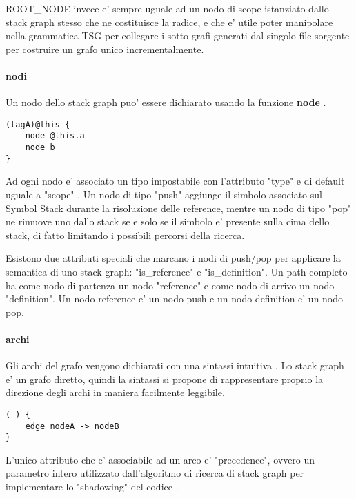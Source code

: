 ROOT\_NODE invece e' sempre uguale ad un nodo di scope istanziato dallo stack graph stesso che ne costituisce la radice, e che e' utile poter manipolare nella grammatica TSG per collegare i sotto grafi generati dal singolo file sorgente per costruire un grafo unico incrementalmente.

\paragraph{nodi}

Un nodo dello stack graph puo' essere dichiarato usando la funzione \textbf{node} \cite{TreeSitterGraphReferenceGraphNodes}.

\begin{Verbatim}[samepage=true]
(tagA)@this {
    node @this.a
    node b
}
\end{Verbatim}

Ad ogni nodo e' associato un tipo impostabile con l'attributo "type" e di default uguale a "scope" \cite{TreeSitterStackGraphNodes}.
Un nodo di tipo "push" aggiunge il simbolo associato sul Symbol Stack durante la risoluzione delle reference, mentre un nodo di tipo "pop" ne rimuove uno dallo stack se e solo se il simbolo e' presente sulla cima dello stack, di fatto limitando i possibili percorsi della ricerca.

Esistono due attributi speciali che marcano i nodi di push/pop per applicare la semantica di uno stack graph: "is\_reference" e "is\_definition".
Un path completo ha come nodo di partenza un nodo "reference" e come nodo di arrivo un nodo "definition".
Un nodo reference e' un nodo push e un nodo definition e' un nodo pop.

\paragraph{archi}

Gli archi del grafo vengono dichiarati con una sintassi intuitiva \cite{TreeSitterGraphReferenceEdges}.
Lo stack graph e' un grafo diretto, quindi la sintassi si propone di rappresentare proprio la direzione degli archi in maniera facilmente leggibile.

\begin{Verbatim}[samepage=true]
(_) {
    edge nodeA -> nodeB
}
\end{Verbatim}

L'unico attributo che e' associabile ad un arco e' "precedence", ovvero un parametro intero utilizzato dall'algoritmo di ricerca di stack graph per implementare lo "shadowing" del codice \cite{TreeSitterStackGraphEdges}.

